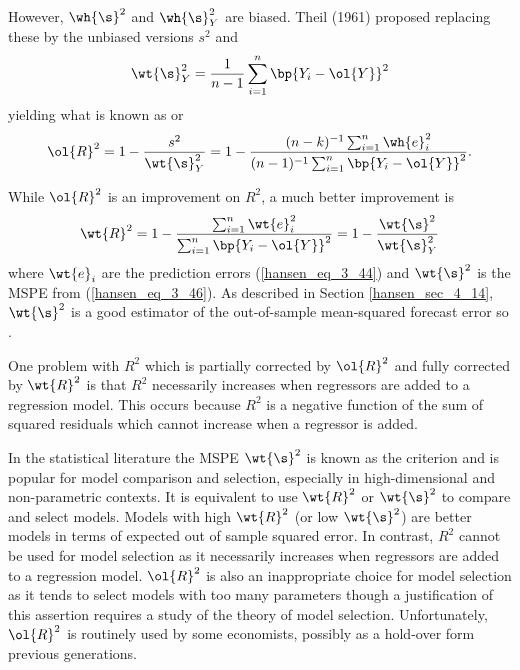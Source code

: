 However, $\wh{\s}^2$ and $\wh{\s}_Y^2$ are biased. Theil (1961) proposed replacing these by the unbiased versions $s^2$ and $$\wt{\s}_Y^2 = \frac{1}{n-1}\sum_{i=1}^{n} \bp{Y_i - \ol{Y}}^2$$ yielding what is known as  or  
\begin{equation}
    \notag 
    \ol{R}^2 = 1 - \frac{s^2}{\wt{\s}_Y^2} = 1 - \frac{(n-k)^{-1} \sum_{i=1}^{n} \wh{e}_i^2}{(n-1)^{-1} \sum_{i=1}^n \bp{Y_i - \ol{Y}}^2}.
\end{equation}

While $\ol{R}^2$ is an improvement on $R^2$, a much better improvement is 
\begin{equation}
    \notag
    \wt{R}^2 = 1 - \frac{\sum_{i=1}^{n} \wt{e}_i^2}{\sum_{i=1}^{n} \bp{Y_i - \ol{Y}}^2} = 1 - \frac{\wt{\s}^2}{\wt{\s}_Y^2}
\end{equation}
where $\wt{e}_i$ are the prediction errors (\ref{hansen_eq_3_44}) and $\wt{\s}^2$ is the MSPE from (\ref{hansen_eq_3_46}). As described in Section \ref{hansen_sec_4_14}, $\wt{\s}^2$ is a good estimator of the out-of-sample mean-squared forecast error so .

One problem with $R^2$ which is partially corrected by $\ol{R}^2$ and fully corrected by $\wt{R}^2$ is that $R^2$ necessarily increases when regressors are added to a regression model. This occurs because $R^2$ is a negative function of the sum of squared residuals which cannot increase when a regressor is added. 

In the statistical literature the MSPE $\wt{\s}^2$ is known as the  criterion and is popular for model comparison and selection, especially in high-dimensional and non-parametric contexts. It is equivalent to use $\wt{R}^2$ or $\wt{\s}^2$ to compare and select models. Models with high $\wt{R}^2$ (or low $\wt{\s}^2$) are better models in terms of expected out of sample squared error. In contrast, $R^2$ cannot be used for model selection as it necessarily increases when regressors are added to a regression model. $\ol{R}^2$ is also an inappropriate choice for model selection as it tends to select models with too many parameters though a justification of this assertion requires a study of the theory of model selection. Unfortunately, $\ol{R}^2$ is routinely used by some economists, possibly as a hold-over form previous generations.

